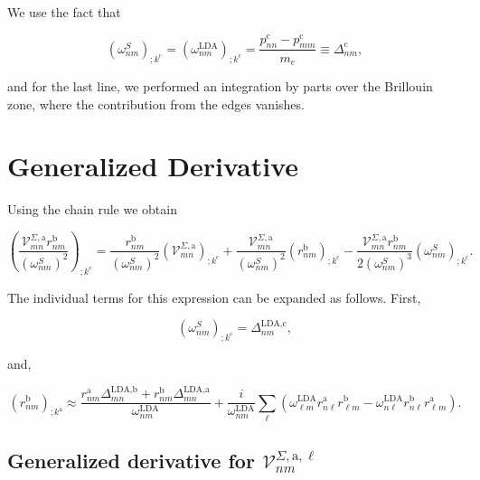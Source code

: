 \documentclass[11pt]{article}
\begin{document}
We use the fact that

\begin{equation}\label{wk}
(\omega^S_{nm})_{;k^{\text{c}}}=(\omega^\text{LDA}_{nm})_{;k^{\text{c}}} = \frac{p_{nn}^{\text{c}}-p_{mm}^{\text{c}}}{m_{e}} \equiv \Delta_{nm}^{\text{c}},
\end{equation}

and for the last line, we performed an integration by parts over the Brillouin zone, where the contribution from the edges vanishes.

\section{Generalized Derivative}

Using the chain rule we obtain

\begin{equation}\label{chrn}
\left(\frac{\mathcal{V}^{\Sigma,\text{a}}_{mn}r^{\text{b}}_{nm}}{(\omega^S_{nm})^2}\right)_{;k^{\text{c}}} = \frac{r^{\text{b}}_{nm}}{(\omega^S_{nm})^2}\left(\mathcal{V} ^{\Sigma,\text{a}}_{mn}\right)_{;k^{\text{c}}} + \frac{\mathcal{V}^{\Sigma,\text{a}}_{mn}}{(\omega^S_{nm})^2}\left(r^{\text{b}}_{nm}\right)_{;k^{\text{c}}} - \frac{\mathcal{V}^{\Sigma,\text{a}}_{mn}r^{\text{b}}_{nm}}{2(\omega^S_{nm})^3}\left(\omega^S_{nm}\right)_{;k^{\text{c}}}.
\end{equation}

The individual terms for this expression can be expanded as follows. First,

\begin{equation}\label{eli.1}
\left(\omega^S_{nm}\right)_{;k^{\text{c}}} = \Delta^{\text{LDA},\text{c}}_{nm},
\end{equation}

and,

\begin{equation}\label{eli.2}
(r^{\text{b}}_{nm})_{;k^{\text{a}}} \approx \frac{r^{\text{a}}_{nm}\Delta^{\text{LDA},\text{b}}_{mn} + r^{\text{b}}_{nm}\Delta^{\text{LDA},\text{a}}_{mn}}{\omega^\text{LDA}_{nm}} + \frac{i}{\omega^\text{LDA}_{nm}}\sum_{\ell}\left(\omega^\text{LDA}_{\ell m}r^{\text{a}}_{n\ell}r^{\text{b}}_{\ell m} - \omega^\text{LDA}_{n\ell}r^{\text{b}}_{n\ell}r^{\text{a}}_{\ell m}\right).
\end{equation}

\subsection{Generalized derivative for \texorpdfstring{$\mathcal{V}^{\Sigma,\text{a},\ell}_{nm}$}{V-Sigma}}
\end{document}
